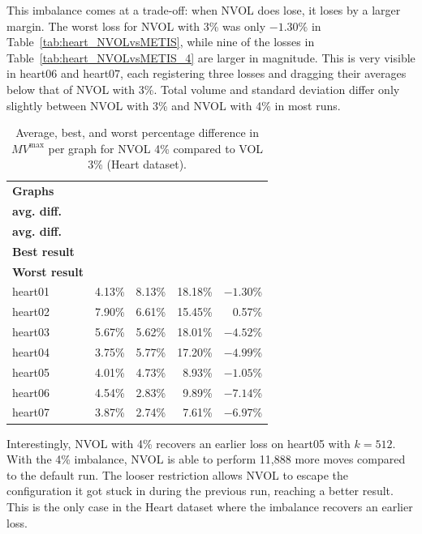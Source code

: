This imbalance comes at a trade-off: when NVOL does lose, it loses by a larger margin. The worst loss for NVOL with 3\% was only $-1.30\%$ in Table~\ref{tab:heart_NVOLvsMETIS}, while nine of the losses in Table~\ref{tab:heart_NVOLvsMETIS_4} are larger in magnitude. This is very visible in heart06 and heart07, each registering three losses and dragging their averages below that of NVOL with 3\%. Total volume and standard deviation differ only slightly between NVOL with 3\% and NVOL with 4\% in most runs.

\begin{table}[h]
	\centering
	\begin{tabular}{|l|r|r|r|r|}
		\hline
		\textbf{Graphs} 
			& \makecell{\textbf{NVOL 3\%}\\\textbf{avg. diff.}} 
			& \makecell{\textbf{NVOL 4\%}\\\textbf{avg. diff.}}
			& \makecell{\textbf{NVOL 4\%}\\\textbf{Best result}}
			& \makecell{\textbf{NVOL 4\%}\\\textbf{Worst result}}\\
		\hline
		heart01 & 4.13\% & 8.13\% & 18.18\% & $-1.30$\%\\
		\hline
		heart02 & 7.90\% & 6.61\% & 15.45\% & 0.57\%\\
		\hline
		heart03 & 5.67\% & 5.62\% & 18.01\% & $-4.52$\%\\
		\hline
		heart04 & 3.75\% & 5.77\% & 17.20\% & $-4.99$\%\\
		\hline
		heart05 & 4.01\% & 4.73\% & 8.93\% & $-1.05$\%\\
		\hline
		heart06 & 4.54\% & 2.83\% & 9.89\% & $-7.14$\%\\
		\hline
		heart07 & 3.87\% & 2.74\% & 7.61\% & $-6.97$\%\\
		\hline
	\end{tabular}
	\caption{Average, best, and worst percentage difference in $MV^{\mathrm{max}}$ per graph for NVOL 4\% compared to VOL 3\% (Heart dataset).}
	\label{tab:heart_NVOL_NVOL4_avg}
\end{table}

Interestingly, NVOL with 4\% recovers an earlier loss on heart05 with $k=512$. With the 4\% imbalance, NVOL is able to perform 11,888 more moves compared to the default run. The looser restriction allows NVOL to escape the configuration it got stuck in during the previous run, reaching a better result. This is the only case in the Heart dataset where the imbalance recovers an earlier loss.

